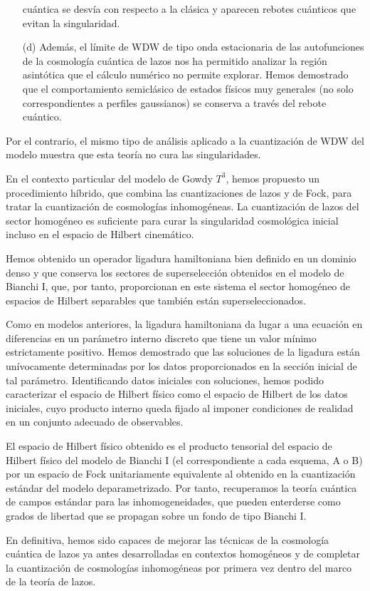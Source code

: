 \begin{list}{}{\leftmargin=1em}
\begin{itemize}
cuántica se desvía con respecto a la clásica y aparecen rebotes cuánticos que evitan la
singularidad. 
\item[(d)] Además, el límite de WDW de tipo onda estacionaria de las autofunciones de la
cosmología cuántica de lazos nos ha permitido analizar la región asintótica que el cálculo
numérico no permite explorar. Hemos demostrado que el comportamiento semiclásico de estados físicos
muy generales (no solo correspondientes a perfiles gaussianos) se conserva a través del rebote
cuántico.
\end{itemize}
Por el contrario, el mismo tipo de análisis aplicado a la cuantización de WDW del modelo
muestra que esta teoría no cura las singularidades.
\item En el contexto particular del modelo de Gowdy $T^3$, hemos propuesto un procedimiento híbrido,
que combina las cuantizaciones de lazos y de Fock, para tratar la cuantización de cosmologías
inhomogéneas. La cuantización de lazos del sector homogéneo es suficiente para curar la singularidad
cosmológica inicial incluso en el espacio de Hilbert cinemático.
\item Hemos obtenido un operador ligadura hamiltoniana bien definido en un dominio
denso y que conserva los sectores de superselección obtenidos en el modelo de Bianchi I, que, por
tanto, proporcionan en este sistema el sector homogéneo de espacios de Hilbert separables que
también están superseleccionados.
\item Como en modelos anteriores, la ligadura hamiltoniana da lugar a una ecuación en
diferencias en un parámetro interno discreto que tiene un valor mínimo estrictamente positivo.
Hemos demostrado que las soluciones de la ligadura están unívocamente determinadas por los datos
proporcionados en la sección inicial de tal parámetro. Identificando datos iniciales con soluciones,
hemos podido caracterizar el espacio de Hilbert físico como el espacio de Hilbert de los datos
iniciales, cuyo producto interno queda fijado al imponer condiciones de realidad en un conjunto
adecuado de observables.
\item El espacio de Hilbert físico obtenido es el producto tensorial del espacio de Hilbert físico
del modelo de Bianchi I (el correspondiente a cada esquema, A o B) por un espacio de Fock
unitariamente equivalente al obtenido en la cuantización estándar del modelo deparametrizado.
Por tanto, recuperamos la teoría cuántica de campos estándar para las inhomogeneidades, que pueden
enterderse como grados de libertad que se propagan sobre un fondo de tipo Bianchi I.
\item En definitiva, hemos sido capaces de mejorar las técnicas de la cosmología cuántica de lazos
ya antes desarrolladas en contextos homogéneos y de completar la cuantización de cosmologías
inhomogéneas por primera vez dentro del marco de la teoría de lazos.
\end{list}

 
\cleardoublepage



